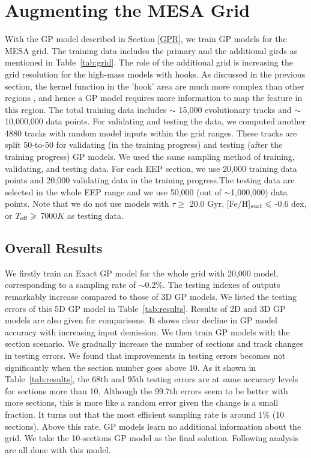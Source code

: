 \section{Augmenting the MESA Grid}\label{sec:augmentation}

With the GP model described in Section \ref{GPR},  we train GP models for the MESA grid. The training data includes the primary and the additional girds as mentioned in Table~\ref{tab:grid}. The role of the additional grid is increasing the grid resolution for the high-mass models with hooks. As discussed in the previous section, the kernel function in the 'hook' area are much more complex than other regions , and hence a GP model requires more information to map the feature in this region. The total training data includes $\sim$ 15,000 evolutionary tracks and $\sim$ 10,000,000 data points. For validating and testing the data, we computed another 4880 tracks with random model inputs within the grid ranges. These tracks are split 50-to-50 for validating (in the training progress) and testing (after the training progress) GP models. We used the same sampling method of training, validating, and testing data. For each EEP section, we use 20,000 training data points and 20,000 validating data in the training progress.The testing data are selected in the whole EEP range and we use 50,000 (out of $\sim$1,000,000) data points. Note that we do not use models with $\tau \geq$ 20.0 Gyr, [Fe/H]$_{\rm surf} \leq$ -0.6 dex, or $T_{\rm eff} \geq$ 7000$K$ as testing data.    

\subsection{Overall Results}

We firstly train an Exact GP model for the whole grid with 20,000 model, corresponding to a sampling rate of $\sim$0.2\%. The testing indexes of outputs remarkably increase compared to those of 3D GP models. We listed the testing errors of this 5D GP model in Table~\ref{tab:results}. Results of 2D and 3D GP models are also given for comparisons. It shows clear decline in GP model accuracy with increasing input demission. 
%
We then train GP models with the section scenario. We gradually increase the number of sections and track changes in testing errors. We found that improvements in testing errors becomes not significantly when the section number goes above 10. As it shown in Table~\ref{tab:results}, the 68th and 95th testing errors are at same accuracy levels for sections more than 10. Although the 99.7th errors seem to be better with more sections, this is more like a random error given the change is a small fraction. 
%
It turns out that the most efficient sampling rate is around 1\% (10 sections). Above this rate, GP models learn no additional information about the grid.  
%
We take the 10-sections GP model as the final solution. Following analysis are all done with this model.   


